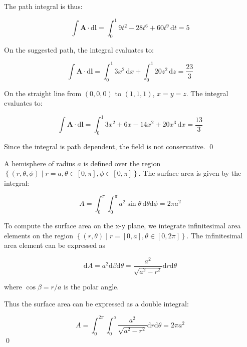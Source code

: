 \documentclass[12pt]{article}
\begin{document}
The path integral is thus:

\begin{equation}
    \int \mathbf{A} \cdot \mathrm{d}\mathbf{l} = \int_{0}^{1} 9t^{2} - 28t^{6} + 60t^{9} \, \mathrm{d}t = 5
\end{equation}

On the suggested path, the integral evaluates to:

\begin{equation}
    \int \mathbf{A} \cdot \mathrm{d}\mathbf{l} = \int_{0}^{1} 3x^{2} \, \mathrm{d}x + \int_{0}^{1} 20z^{2} \, \mathrm{d}z = \frac{23}{3}
\end{equation}

On the straight line from $(0, 0, 0)$ to $(1, 1, 1)$, $x = y = z$. The integral evaluates to:

\begin{equation}
    \int \mathbf{A} \cdot \mathrm{d}\mathbf{l} = \int_{0}^{1} 3x^{2} + 6x - 14x^{2} + 20x^{3} \, \mathrm{d}x = \frac{13}{3}
\end{equation}

Since the integral is path dependent, the field is not conservative.
\qed



A hemisphere of radius $a$ is defined over the region $\left\{ (r, \theta, \phi) \mid r = a, \theta \in [0, \pi], \phi \in [0, \pi] \right\}$. The surface area is given by the integral:

\begin{equation}
    A = \int_{0}^{\pi} \int_{0}^{\pi} a^{2} \sin{\theta} \, \mathrm{d}\theta \mathrm{d}\phi = 2\pi a^{2}
\end{equation}

To compute the surface area on the x-y plane, we integrate infinitesimal area elements on the region $\left\{ (r, \theta) \mid r = [0, a], \theta \in [0, 2\pi] \right\}$. The infinitesimal area element can be expressed as

\begin{equation}
    \mathrm{d}A = a^{2} \mathrm{d}\beta \mathrm{d}\theta = \frac{a^{2}}{\sqrt{a^{2} - r^{2}}} \mathrm{d}r \mathrm{d}\theta
\end{equation}

where $\cos{\beta} = r/a$ is the polar angle.

Thus the surface area can be expressed as a double integral:

\begin{equation}
    A = \int_{0}^{2\pi} \int_{0}^{a} \frac{a^{2}}{\sqrt{a^{2} - r^{2}}} \mathrm{d}r \mathrm{d}\theta = 2\pi a^{2}
\end{equation}
\qed
\end{document}
